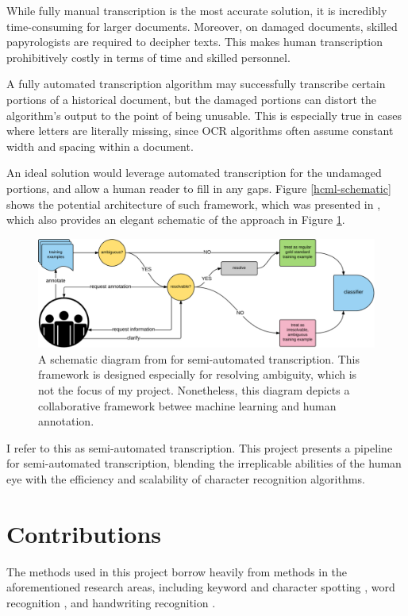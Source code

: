 \documentclass[final]{ukthesis}
\begin{document}
While fully manual transcription is the most accurate solution, it is incredibly time-consuming for larger documents. Moreover, on damaged documents, skilled papyrologists are required to decipher texts. This makes human transcription prohibitively costly in terms of time and skilled personnel.

A fully automated transcription algorithm may successfully transcribe certain portions of a historical document, but the damaged portions can distort the algorithm's output to the point of being unusable. This is especially true in cases where letters are literally missing, since OCR algorithms often assume constant width and spacing within a document.

An ideal solution would leverage automated transcription for the undamaged portions, and allow a human reader to fill in any gaps. Figure \ref{hcml-schematic} shows the potential architecture of such framework, which was presented in \cite{schaekermann2016resolvable}, which also provides an elegant schematic of the approach in Figure \ref{fig:hcml-schematic}.


\begin{figure}[t]
\begin{center}
\includegraphics[width=14cm]{hcml-schematic}
\end{center}
\caption{A schematic diagram from \cite{schaekermann2016resolvable} for semi-automated transcription. This  framework is designed especially for resolving ambiguity, which is not the focus of my project. Nonetheless, this diagram depicts a collaborative framework betwee machine learning and human annotation.}
\label{fig:hcml-schematic}
\end{figure}

I refer to this as semi-automated transcription. This project presents a pipeline for semi-automated transcription, blending the irreplicable abilities of the human eye with the efficiency and scalability of character recognition algorithms.



%
%
\section{Contributions}
The methods used in this project borrow heavily from methods in the aforementioned research areas, including keyword and character spotting \cite{sharma2015adapting,frinken2012novel}, word recognition \cite{howe2009finding}, and handwriting recognition \cite{fischer2013fast,bluche2013feature}.
\end{document}
